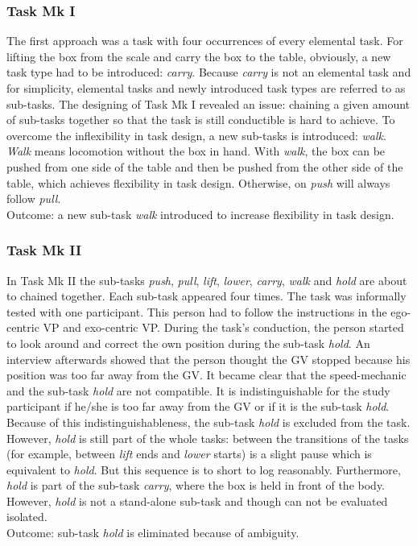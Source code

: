 \subsubsection{Task Mk I}
The first approach was a task with four occurrences of every elemental task. For lifting the box from the scale and carry the box to the table, obviously, a new task type had to be introduced: \textit{carry}. Because \textit{carry} is not an elemental task and for simplicity, elemental tasks and newly introduced task types are referred to as sub-tasks. The designing of Task Mk I revealed an issue: chaining a given amount of sub-tasks together so that the task is still conductible is hard to achieve. To overcome the inflexibility in task design, a new sub-tasks is introduced: \textit{walk}. \textit{Walk} means locomotion without the box in hand. With \textit{walk}, the box can be pushed from one side of the table and then be pushed from the other side of the table, which achieves flexibility in task design. Otherwise, on \textit{push} will always follow \textit{pull}.\\
Outcome: a new sub-task \textit{walk} introduced to increase flexibility in task design.

\subsubsection{Task Mk II}
In Task Mk II the sub-tasks \textit{push}, \textit{pull}, \textit{lift}, \textit{lower}, \textit{carry}, \textit{walk} and \textit{hold} are about to chained together. Each sub-task appeared four times. The task was informally tested with one participant. This person had to follow the instructions in the ego-centric VP and exo-centric VP. During the task's conduction, the person started to look around and correct the own position during the sub-task \textit{hold}. An interview afterwards showed that the person thought the GV stopped because his position was too far away from the GV. It became clear that the speed-mechanic and the sub-task \textit{hold} are not compatible. It is indistinguishable for the study participant if he/she is too far away from the GV or if it is the sub-task \textit{hold}. Because of this indistinguishableness, the sub-task \textit{hold} is excluded from the task. However, \textit{hold} is still part of the whole tasks: between the transitions of the tasks (for example, between \textit{lift} ends and \textit{lower} starts) is a slight pause which is equivalent to \textit{hold}. But this sequence is to short to log reasonably. Furthermore, \textit{hold} is part of the sub-task \textit{carry}, where the box is held in front of the body. However, \textit{hold} is not a stand-alone sub-task and though can not be evaluated isolated.\\
Outcome: sub-task \textit{hold} is eliminated because of ambiguity.

